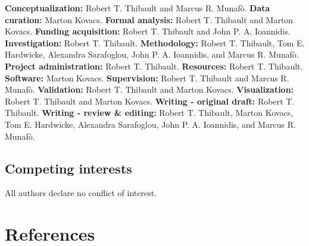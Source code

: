 \documentclass[
  man,floatsintext]{apa6}
\begin{document}
\textbf{Conceptualization:} Robert T. Thibault and Marcus R. Munafò.\hfill\break
\textbf{Data curation:} Marton Kovacs.\hfill\break
\textbf{Formal analysis:} Robert T. Thibault and Marton Kovacs.\hfill\break
\textbf{Funding acquisition:} Robert T. Thibault and John P. A. Ioannidis.\hfill\break
\textbf{Investigation:} Robert T. Thibault.\hfill\break
\textbf{Methodology:} Robert T. Thibault, Tom E. Hardwicke, Alexandra Sarafoglou, John P. A. Ioannidis, and Marcus R. Munafò.\hfill\break
\textbf{Project administration:} Robert T. Thibault.\hfill\break
\textbf{Resources:} Robert T. Thibault.\hfill\break
\textbf{Software:} Marton Kovacs.\hfill\break
\textbf{Supervision:} Robert T. Thibault and Marcus R. Munafò.\hfill\break
\textbf{Validation:} Robert T. Thibault and Marton Kovacs.\hfill\break
\textbf{Visualization:} Robert T. Thibault and Marton Kovacs.\hfill\break
\textbf{Writing - original draft:} Robert T. Thibault.\hfill\break
\textbf{Writing - review \& editing:} Robert T. Thibault, Marton Kovacs, Tom E. Hardwicke, Alexandra Sarafoglou, John P. A. Ioannidis, and Marcus R. Munafò.

\hypertarget{competing-interests}{%
\subsection{Competing interests}\label{competing-interests}}

All authors declare no conflict of interest.

\newpage

\hypertarget{references}{%
\section{References}\label{references}}
\end{document}
